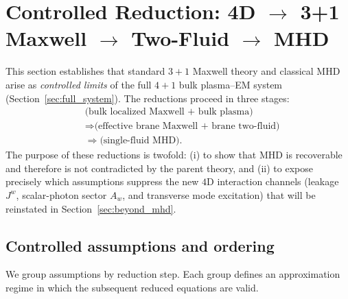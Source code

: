 \documentclass[11pt]{article}
\begin{document}
\section{Controlled Reduction: 4D \texorpdfstring{$\to$}{->} 3+1 Maxwell \texorpdfstring{$\to$}{->} Two-Fluid \texorpdfstring{$\to$}{->} MHD}
\label{sec:mhd_reduction}

This section establishes that standard \(3+1\) Maxwell theory and classical MHD arise
as \emph{controlled limits} of the full \(4+1\) bulk plasma--EM system
(Section~\ref{sec:full_system}). The reductions proceed in three stages:
\begin{equation}
\begin{aligned}
&\text{(bulk localized Maxwell + bulk plasma)}
\\
&\Longrightarrow \text{(effective brane Maxwell + brane two-fluid)}
\\
&\Longrightarrow \text{(single-fluid MHD)}.
\end{aligned}
\end{equation}
The purpose of these reductions is twofold:
(i) to show that MHD is recoverable and therefore is not contradicted by the parent
theory, and (ii) to expose precisely which assumptions suppress the new \(4\)D
interaction channels (leakage \(J^w\), scalar-photon sector \(A_w\), and transverse
mode excitation) that will be reinstated in Section~\ref{sec:beyond_mhd}.

\subsection{Controlled assumptions and ordering}
\label{sec:controlled_assumptions}

We group assumptions by reduction step. Each group defines an approximation regime
in which the subsequent reduced equations are valid.
\end{document}
